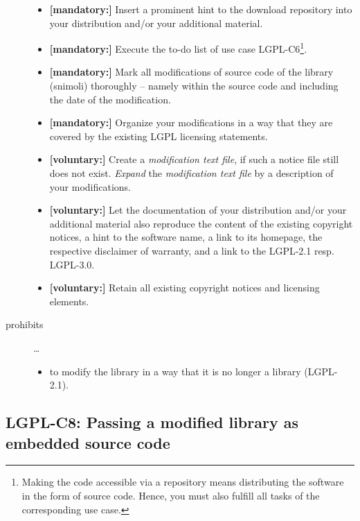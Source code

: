 \begin{description}
\begin{itemize}
  \item \textbf{[mandatory:]} Insert a prominent hint to the download repository
  into your distribution and/or your additional material.
  
  \item \textbf{[mandatory:]} Execute the to-do list of use case LGPL-C6\footnote{
  Making the code accessible via a repository means distributing the software in
  the form of source code. Hence, you must also fulfill all tasks of the
  corresponding use case.}.

  \item \textbf{[mandatory:]} Mark all modifications of source code of the
  library (snimoli) thoroughly -- namely within the source code and including
  the date of the modification.
  
  \item \textbf{[mandatory:]} Organize your modifications in a way that they are
  covered by the existing LGPL licensing statements.

  \item \textbf{[voluntary:]} Create a \emph{modification text file}, if such a
  notice file still does not exist. \emph{Expand} the \emph{modification text
  file} by a description of your modifications.

  \item \textbf{[voluntary:]} Let the documentation of your distribution and/or
  your additional material also reproduce the content of the existing
  copyright notices, a hint to the software name, a link to its homepage,
  the respective disclaimer of warranty, and a link to the LGPL-2.1 resp.
  LGPL-3.0.
  
  \item \textbf{[voluntary:]} Retain all existing copyright notices and
  licensing elements. 
  
\end{itemize}

\item[prohibits] \ldots
\begin{itemize}
  \item to modify the library in a way that it is no longer a library
  (LGPL-2.1).
\end{itemize}

\end{description}

\subsection{LGPL-C8: Passing a modified library as embedded source code}
\label{OSUC-10S-LGPL}

